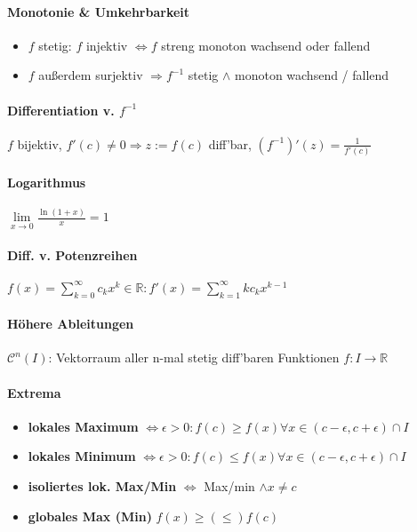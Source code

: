 \documentclass[paper=a4,paper=landscape, fontsize=6pt,DIV=25, twoside]{scrartcl}
\newcommand{\real}{{\mathbb{R}}}
\begin{document}
\begin{multicols*}{4}
			\paragraph{Monotonie \& Umkehrbarkeit}
			\begin{itemize}
				\item $f$ stetig: $f$ injektiv $\Leftrightarrow f$ streng monoton wachsend oder fallend
				\item $f$ außerdem surjektiv $\Rightarrow f^{-1}$ stetig $\wedge$ monoton wachsend / fallend
			\end{itemize}
			\paragraph{Differentiation v. $f^{-1}$}
			$f$ bijektiv, $f'(c) \neq 0 \Rightarrow z := f(c)$ diff'bar, $(f^{-1})'(z)=\frac{1}{f'(c)}$
			\paragraph{Logarithmus}
			$\lim\limits_{x\rightarrow0} \frac{\ln(1+x)}{x}=1$
			\paragraph{Diff. v. Potenzreihen}
			$\displaystyle f(x)=\sum_{k=0}^{\infty}c_kx^k \in \real: f'(x)=\sum_{k=1}^{\infty}kc_kx^{k-1}$
			\paragraph{Höhere Ableitungen}
			$\mathscr{C}^n(I)$: Vektorraum aller n-mal stetig diff'baren Funktionen $f: I \rightarrow \real$
			\paragraph{Extrema}
			\begin{itemize}
				\item \textbf{lokales Maximum} $\Leftrightarrow \epsilon > 0: f(c) \geq f(x) \forall x \in (c-\epsilon,c+\epsilon)\cap I$
				\item \textbf{lokales Minimum} $\Leftrightarrow \epsilon > 0: f(c) \leq f(x) \forall x \in (c-\epsilon,c+\epsilon)\cap I$
				\item \textbf{isoliertes lok. Max/Min} $\Leftrightarrow$ Max/min $\wedge x \neq c$
				\item \textbf{globales Max (Min)} $f(x) \geq (\leq) f(c)$ 
			\end{itemize}
\end{multicols*}
\end{document}
